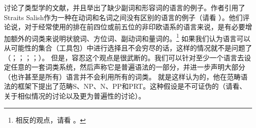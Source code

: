  \citet[\S~2.2.4]{EL2009a}讨论了类型学的文献，并且举出了缺少副词和形容词的语言的例子。作者引用了Straits Salish作为一种在动词和名词之间没有区别的语言的例子（请看 \citealp[]{EL2009b}）。他们评论说，对于经常使用的排在前四位或前五位的非印欧语系的语言来说，是有必要增加额外的词类来说明状貌词、方位词、副动词和量词的。\footnote{%
相反的观点，请看 。
} 
如果我们认为语言可以从可能性的集合（工具包）中进行选择且不会穷尽的话，这样的情况就不是问题了（\citealp[]{Jackendoff2002a-u}；\citealp[]{Newmeyer2005a}；\citealp*[]{FHC2005a}；\citealp[--7]{Chomsky2007a}；\citealp[, 58, 65]{CR2010a}）。
但是，容忍这个观点是很武断的。我们可以针对至少一个语言去设定任意的一套词类系统，然后声称它是普遍语法的一部分，并进一步声明大部分（也许甚至是所有）语言并不会利用所有的词类。 \citet[]{Villavicencio2002a}就是这样认为的，他在范畴语法的框架下提出了范畴S、NP、N、PP和PRT。这种假设是不可证伪的（请看\citealp[]{EL2009a}、\citealp[]{Tomasello2009a}关于相似情况的讨论以及更为普遍性的讨论）。

